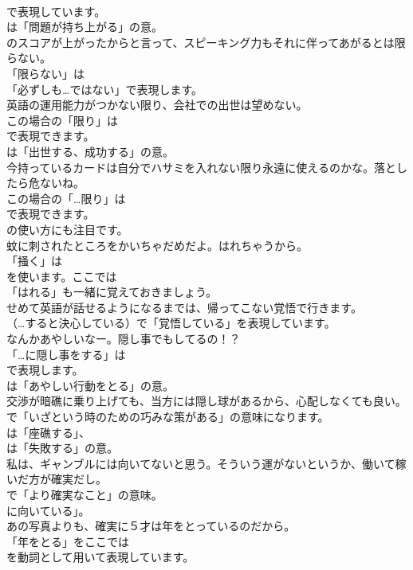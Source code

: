 \documentclass[8pt]{extreport}
\begin{document}
\begin{CJK}{UTF8}{min}
\\	で表現しています。
\\	は「問題が持ち上がる」の意。	
\\	のスコアが上がったからと言って、スピーキング力もそれに伴ってあがるとは限らない。 
\\	「限らない」は
\\	「必ずしも…ではない」で表現します。	
\\	英語の運用能力がつかない限り、会社での出世は望めない。 
\\	この場合の「限り」は
\\	で表現できます。
\\	は「出世する、成功する」の意。	
\\	今持っているカードは自分でハサミを入れない限り永遠に使えるのかな。落としたら危ないね。 
\\	この場合の「…限り」は 
\\	で表現できます。
\\	の使い方にも注目です。	
\\	蚊に刺されたところをかいちゃだめだよ。はれちゃうから。 
\\	「掻く」は
\\	を使います。ここでは
\\	「はれる」も一緒に覚えておきましょう。	
\\	せめて英語が話せるようになるまでは、帰ってこない覚悟で行きます。 
\\	（…すると決心している）で「覚悟している」を表現しています。	
\\	なんかあやしいなー。隠し事でもしてるの！？ 
\\	「…に隠し事をする」は 
\\	で表現します。
\\	は「あやしい行動をとる」の意。	
\\	交渉が暗礁に乗り上げても、当方には隠し球があるから、心配しなくても良い。 
\\	で「いざという時のための巧みな策がある」の意味になります。
\\	は「座礁する」、
\\	は「失敗する」の意。	
\\	私は、ギャンブルには向いてないと思う。そういう運がないというか、働いて稼いだ方が確実だし。 
\\	で「より確実なこと」の意味。
\\	に向いている」。	
\\	あの写真よりも、確実に５才は年をとっているのだから。 
\\	「年をとる」をここでは
\\	を動詞として用いて表現しています。	

\end{CJK}
\end{document}
